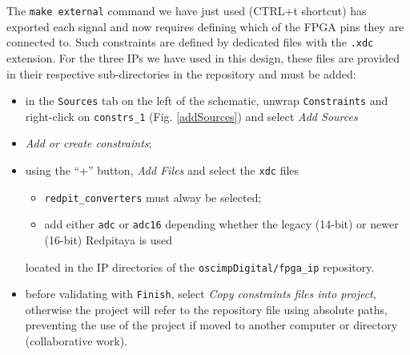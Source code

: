 \documentclass[10pt,oneside]{article}
\begin{document}

The {\tt make external} command we have just used (CTRL+t shortcut) has exported
each signal and now requires defining which of the FPGA pins they are connected to.
Such constraints are defined by dedicated files with the {\tt .xdc} extension. For the
three IPs we have used in this design, these files are provided in their respective 
sub-directories in the repository and must be added:
\begin{itemize}
\item in the {\tt Sources} tab on the left of the schematic, unwrap {\tt Constraints} 
and right-click on {\tt constrs\_1} (Fig. \ref{addSources}) and select {\em Add Sources}
\item {\em Add or create constraints};
\item using the ``+'' button, {\em Add Files} and select the {\tt xdc} files
	\begin{itemize}
\item {\tt redpit\_converters} must alway be selected;
\item add either {\tt adc} or {\tt adc16} depending whether the legacy (14-bit) or newer (16-bit)
Redpitaya is used %
	\end{itemize}
located in the IP directories of the {\tt oscimpDigital/fpga\_ip} repository.
\item before validating with {\tt Finish}, select {\em Copy constraints
files into project}, otherwise the project will refer to the repository file
using absolute paths, preventing the use of the project if moved to another
computer or directory (collaborative work).
\end{itemize}
\end{document}
